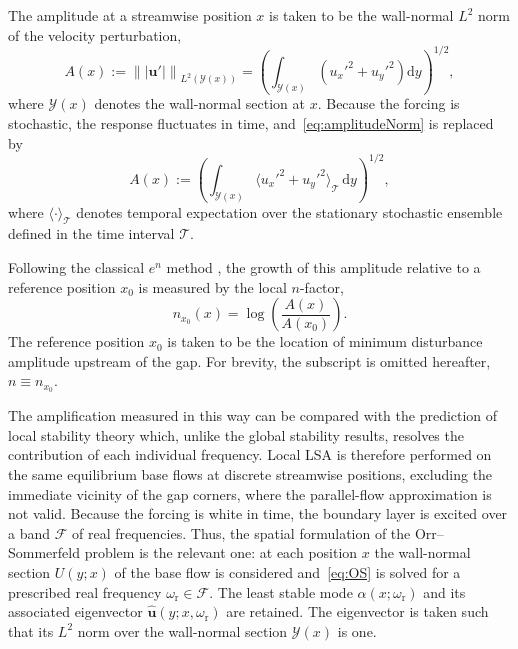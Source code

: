 \documentclass[lineno]{jfm}
\begin{document}
The amplitude at a streamwise position $x$ is taken to be the wall-normal $L^2$ norm of the velocity perturbation,
\begin{equation}
	A(x) := {\||\boldsymbol{u}'|\|}_{L^2(\mathcal{Y}(x))} = {\left( \int_{\mathcal{Y}(x)} ({u_x'}^2 + {u_y'}^2) \mathrm{d}y\right)}^{1/2},
	\label{eq:amplitudeNorm}
\end{equation}
where $\mathcal{Y}(x)$ denotes the wall-normal section at $x$. Because the forcing is stochastic, the response fluctuates in time, and~\eqref{eq:amplitudeNorm} is replaced by
\begin{equation}
	A(x) := {\left( \int_{\mathcal{Y}(x)} {\langle {u_x'}^2 + {u_y'}^2\rangle}_\mathcal{T}\, \mathrm{d}y\right)}^{1/2},
	\label{eq:amplitudeTimeAverage}
\end{equation}
where ${\langle \cdot \rangle}_\mathcal{T}$ denotes temporal expectation over the stationary stochastic ensemble defined in the time interval $\mathcal{T}$.

Following the classical $e^n$ method \citep{smithgamberoni,vanIngen1956}, the growth of this amplitude relative to a reference position $x_0$ is measured by the local $n$-factor,
\begin{equation}
	n_{x_0}(x) = \log\left(\frac{A(x)}{A(x_0)} \right).
\end{equation}
The reference position $x_0$ is taken to be the location of minimum disturbance amplitude upstream of the gap. For brevity, the subscript is omitted hereafter, $n\equiv n_{x_0}$.

The amplification measured in this way can be compared with the prediction of local stability theory which, unlike the global stability results, resolves the contribution of each individual frequency. Local \ac{LSA} is therefore performed on the same equilibrium base flows at discrete streamwise positions, excluding the immediate vicinity of the gap corners, where the parallel-flow approximation is not valid. Because the forcing is white in time, the boundary layer is excited over a band $\mathcal{F}$ of real frequencies. Thus, the spatial formulation of the Orr--Sommerfeld problem is the relevant one: at each position $x$ the wall-normal section $U(y;x)$ of the base flow is considered and~\eqref{eq:OS} is solved for a prescribed real frequency $\omega_\mathrm{r}\in\mathcal{F}$. The least stable mode $\alpha(x;\omega_\mathrm{r})$ and its associated eigenvector $\hat{\boldsymbol{u}}(y;x,\omega_\mathrm{r})$ are retained. The eigenvector is taken such that its $L^2$ norm over the wall-normal section $\mathcal{Y}(x)$ is one. %
\end{document}
